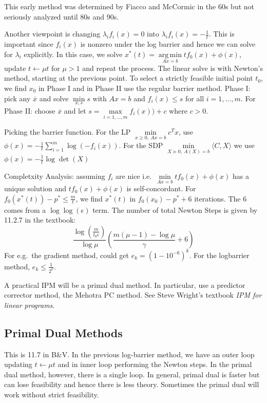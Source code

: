 \documentclass[english, 11pt]{article}
\DeclareMathOperator*{\argmin}{arg\,min}
\begin{document}
This early method was determined by Fiacco and McCormic in the 60s but not seriously analyzed until 80s and 90s.

\begin{rem}
Another viewpoint is changing $\lambda_i f_i(x) =0$ into $\lambda_i f_i(x) = - \frac{1}{t}$. This is important since $f_i(x)$ is nonzero under the log barrier and hence we can solve for $\lambda_i$ explicitly. In this case, we solve $x^*(t) = \argmin \limits_{Ax=b} t f_0(x) + \phi(x)$, update $t \leftarrow \mu t$ for $\mu>1$ and repeat the process. The linear solve is with Newton's method, starting at the previous point. To select a strictly feasible initial point $t_0$, we find $x_0$ in Phase I and in Phase II use the regular barrier method. Phase I: pick any $\overline{x}$ and solve $\min \limits_{x,s} s$ with $Ax=b$ and $f_i(x) \le s$ for all $i=1,\dots,m$. For Phase II: choose $\overline{x}$ and let $s = \max \limits_{i=1,\dots,m} f_i(x)) +c$ where $c>0$.
\end{rem}

\begin{rem}
Picking the barrier function. For the LP $\min \limits_{x \ge 0,\ Ax=b} c^T x$, use $\phi(x) = - \frac{1}{t} \sum_{i=1}^m \log (- f_i(x))$. For the SDP $\min \limits_{X \succeq 0,\ A(X) = b } \langle C, X \rangle$ we use $\phi(x) = - \frac{1}{t} \log \det( X)$
\end{rem}

\begin{rem}
Completxity Analysis: assuming $f_i$ are nice i.e.\ $\min \limits_{Ax=b} t f_0(x) + \phi(x)$ has a unique solution and $t f_0(x) + \phi(x)$ is self-concordant. For $f_0(x^*(t)) - p^* \le \frac{m}{t}$, we find $x^*(t)$ in $f_0(x_0) - p^* + 6$ iterations. The 6 comes from a $\log \log (\epsilon)$ term. The number of total Newton Steps is given by 11.2.7 in the textbook:
\[
\frac{ \log \left( \frac{m}{t_0 \epsilon} \right) }{\log \mu} \left( \frac{ m (\mu-1) - \log \mu}{\gamma} + 6 \right)
\]
For e.g.\ the gradient method, could get $e_k = (1 - 10^{-6})^k$. For the logbarrier method, $e_k \le \frac{1}{2^k}$.
\end{rem}


\begin{rem}
A practical IPM will be a primal dual method. In particular, use a predictor corrector method, the Mehotra PC method. See Steve Wright's textbook {\it IPM for linear programs}.
\end{rem}


\subsection{Primal Dual Methods}
This is 11.7 in B\&V. In the previous log-barrier method, we have an outer loop updating $t \leftarrow \mu t$ and in inner loop performing the Newton steps. In the primal dual method, however, there is a single loop. In general, primal dual is faster but can lose feasibility and hence there is less theory. Sometimes the primal dual will work without strict feasibility.
\end{document}
